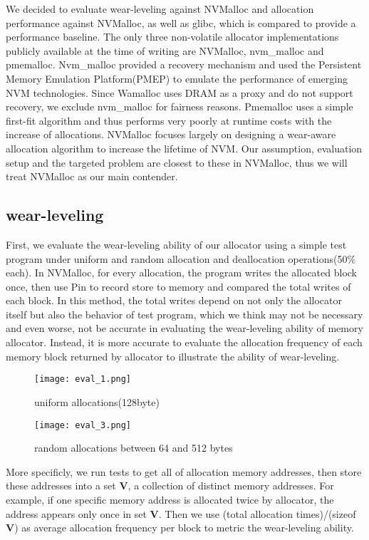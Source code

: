 \documentclass[10pt, conference, compsocconf]{IEEEtran}
\begin{document}
We decided to evaluate wear-leveling against NVMalloc and allocation performance against NVMalloc, as well as glibc,
which is compared to provide a performance baseline. 
The only three non-volatile allocator implementations publicly available at the time of writing are 
NVMalloc, nvm\_malloc\cite{schwalbnvm} and pmemalloc.
Nvm\_malloc provided a recovery mechanism and used the Persistent Memory Emulation Platform(PMEP)\cite{dulloor2014system} to emulate the performance of emerging NVM technologies.
Since Wamalloc uses DRAM as a proxy and do not support recovery, we exclude nvm\_malloc for fairness reasons.
Pmemalloc uses a simple first-fit algorithm and thus performs very poorly at runtime costs with the increase of allocations.
NVMalloc focuses largely on designing a wear-aware allocation algorithm to increase the lifetime of NVM.
Our assumption, evaluation setup and the targeted problem are closest to these in NVMalloc, 
thus we will treat NVMalloc as our main contender.

\subsection{wear-leveling}

First, we evaluate the wear-leveling ability of our allocator
using a simple test program under uniform and random allocation and deallocation operations(50\% each).
In NVMalloc, for every allocation, the program writes the allocated block once, then use Pin\cite{luk2005pin} to record store to memory and compared the total writes of each block.
In this method, the total writes depend on not only the allocator itself but also the behavior of test program,
which we think may not be necessary and even worse, not be accurate in evaluating the wear-leveling ability of memory allocator.
Instead, it is more accurate to evaluate the allocation frequency of each memory block 
returned by allocator to illustrate the ability of wear-leveling.

\begin{figure}[t]
\centering
\texttt{[image: eval\_1.png]}
\caption{uniform allocations(128byte)}
\label{fig:eval_1}
\end{figure}

\begin{figure}[t]
\centering
\texttt{[image: eval\_3.png]}
\caption{random allocations between 64 and 512 bytes}
\label{fig:eval_3}
\end{figure}

More specificly, we run tests to get all of allocation memory addresses, 
then store these addresses into a set \textbf{V},
a collection of distinct memory addresses.
For example, if one specific memory address is allocated twice by allocator, the address appears only once in set \textbf{V}.
Then we use (total allocation times)/(sizeof \textbf{V}) as average allocation frequency per block to metric the wear-leveling ability.
\end{document}

